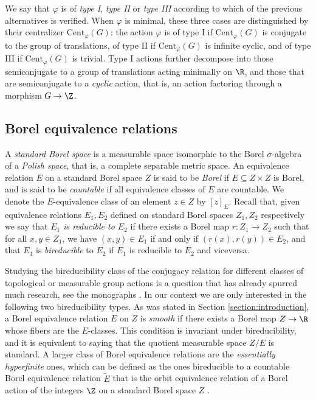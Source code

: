 \documentclass[reqno]{amsart}
\begin{document}
We say that $\varphi$ is of \emph{type I}, \emph{type II} or \emph{type III} according to which of the previous alternatives is verified. When $\varphi$ is minimal, these three cases are distinguished by their centralizer $\mathrm{Cent}_\varphi(G)$: the action $\varphi$ is of type I if $\mathrm{Cent}_\varphi(G)$ is conjugate to the group of translations, of type II if $\mathrm{Cent}_\varphi(G)$ is infinite cyclic, and of type III if $\mathrm{Cent}_\varphi(G)$ is trivial. Type I actions further decompose into those semiconjugate to a group of translations acting minimally on $\R$, and those that are semiconjugate to a \emph{cyclic} action, that is, an action factoring through a morphism $G \to \Z$.


\subsection{Borel equivalence relations} \label{subsection:introBorel}
A \emph{standard Borel space} is a measurable space isomorphic to the Borel $\sigma$-algebra of a \emph{Polish space}, that is, a complete separable metric space. An equivalence relation $E$ on a standard Borel space $Z$ is said to be \emph{Borel} if $E \subseteq Z \times Z$ is Borel, and is said to be \emph{countable} if all equivalence classes of $E$ are countable. We denote the $E$-equivalence class of an element $z \in Z$ by $[z]_E$. Recall that, given equivalence relations $E_1, E_2$ defined on standard Borel spaces $Z_1, Z_2$ respectively we say that \emph{$E_1$ is reducible to $E_2$} if there exists a Borel map $r \colon Z_1 \to Z_2$ such that for all $x,y \in Z_1$, we have $(x,y) \in E_1$ if and only if $(r(x), r(y)) \in E_2$, and that $E_1$ is \emph{bireducible} to $E_2$ if $E_1$ is reducible to $E_2$ and viceversa.

Studying the bireducibility class of the conjugacy relation for different classes of topological or measurable group actions is a question that has already spurred much research, see the monographs \cite{Hjorth2000, KB}. In our context we are only interested in the following two bireducibility types. As was stated in Section \ref{section:introduction}, a Borel equivalence relation $E$ on $Z$ is \emph{smooth} if there exists a Borel map $Z \to \R$ whose fibers are the $E$-classes. This condition is invariant under bireducibility, and it is equivalent to saying that the quotient measurable space $Z/E$ is standard. A larger class of Borel equivalence relations are the \emph{essentially hyperfinite} ones, which can be defined as the ones bireducible to a countable Borel equivalence relation $\widetilde{E}$ that is the orbit equivalence relation of a Borel action of the integers $\Z$ on a standard Borel space $Z$ \cite{SlamanSteel1988}.
\end{document}

